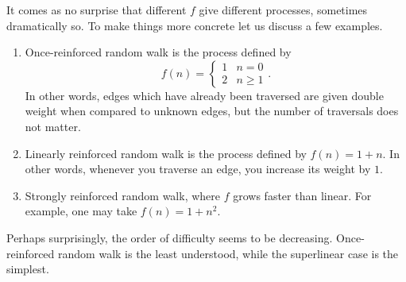 \documentclass{emsprocart}
\theoremstyle{plain}
\begin{document}
It comes as no surprise that different $f$ give different processes,
sometimes dramatically so. To make things more concrete let us discuss
a few examples.
\begin{enumerate}
\item Once-reinforced random walk is the process defined by 
\[
f(n)=\begin{cases}
1 & n=0\\
2 & n\ge1
\end{cases}.
\]
In other words, edges which have already been traversed are given
double weight when compared to unknown edges, but the number of
traversals does not matter.
\item Linearly reinforced random walk is the process defined by $f(n)=1+n$.
In other words, whenever you traverse an edge, you increase its weight
by $1$. 
\item Strongly reinforced random walk, where $f$ grows faster than linear.
For example, one may take $f(n)=1+n^{2}$.
\end{enumerate}
Perhaps surprisingly, the order of difficulty seems to be decreasing.
Once-reinforced random walk is the least understood, while the superlinear
case is the simplest.
\end{document}
